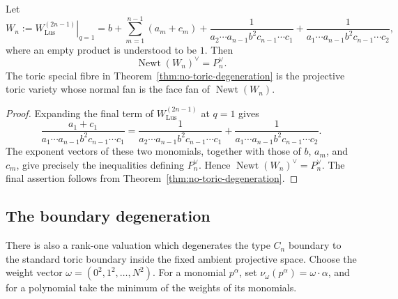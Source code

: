 \begin{cor}
Let
\[
W_n:=\left.W_{\mathrm{Lus}}^{(2n-1)}\right|_{q=1}
=
b+
\sum_{m=1}^{n-1}(a_m+c_m)
+
\frac{1}{a_2\cdots a_{n-1}b^2c_{n-1}\cdots c_1}
+
\frac{1}{a_1\cdots a_{n-1}b^2c_{n-1}\cdots c_2},
\]
where an empty product is understood to be \(1\). Then
\[
\operatorname{Newt}(W_n)^\vee=P_n^\vee.
\]
The toric special fibre in Theorem~\ref{thm:no-toric-degeneration} is the projective toric variety whose normal fan is the face fan of \(\operatorname{Newt}(W_n)\).
\end{cor}

\begin{proof}
Expanding the final term of \(W_{\mathrm{Lus}}^{(2n-1)}\) at \(q=1\) gives
\[
\frac{a_1+c_1}
{a_1\cdots a_{n-1}b^2c_{n-1}\cdots c_1}
=
\frac{1}
{a_2\cdots a_{n-1}b^2c_{n-1}\cdots c_1}
+
\frac{1}
{a_1\cdots a_{n-1}b^2c_{n-1}\cdots c_2}.
\]
The exponent vectors of these two monomials, together with those of \(b\), \(a_m\), and \(c_m\), give precisely the inequalities defining \(P_n^\vee\). Hence \(\operatorname{Newt}(W_n)^\vee=P_n^\vee\). The final assertion follows from Theorem~\ref{thm:no-toric-degeneration}.
\end{proof}

\subsection{The boundary degeneration}
There is also a rank-one valuation which degenerates the type \(C_n\) boundary to the standard toric boundary inside the fixed ambient projective space. Choose the weight vector \(\omega=(0^2,1^2,\ldots,N^2)\). For a monomial \(p^\alpha\), set \(\nu_\omega(p^\alpha)=\omega\cdot\alpha\), and for a polynomial take the minimum of the weights of its monomials.

